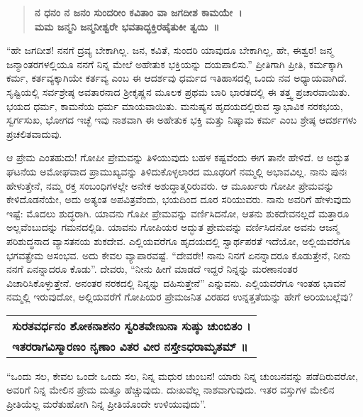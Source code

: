 \begin{verse}
\textbf{ನ ಧನಂ ನ ಜನಂ ಸುಂದರೀಂ ಕವಿತಾಂ ವಾ ಜಗದೀಶ ಕಾಮಯೇ~।}\\\textbf{ಮಮ ಜನ್ಮನಿ ಜನ್ಮನೀಶ್ವರೇ ಭವತಾದ್ಭಕ್ತಿರಹೈತುಕೀ ತ್ವಯಿ~॥}
\end{verse}

“ಹೇ ಜಗದೀಶ! ನನಗೆ ದ್ರವ್ಯ ಬೇಕಾಗಿಲ್ಲ. ಜನ, ಕವಿತೆ, ಸುಂದರಿ ಯಾವುದೂ ಬೇಕಾಗಿಲ್ಲ, ಹೇ, ಈಶ್ವರ! ಜನ್ಮ ಜನ್ಮಾಂತರಗಳಲ್ಲಿಯೂ ನನಗೆ ನಿನ್ನ ಮೇಲೆ ಅಹೇತುಕ ಭಕ್ತಿಯನ್ನು ದಯಪಾಲಿಸು.” ಪ್ರೀತಿಗಾಗಿ ಪ್ರೀತಿ, ಕರ್ಮಕ್ಕಾಗಿ ಕರ್ಮ, ಕರ್ತವ್ಯಕ್ಕಾಗಿಯೇ ಕರ್ತವ್ಯ ಎಂಬ ಈ ಆದರ್ಶವು ಧರ್ಮದ ಇತಿಹಾಸದಲ್ಲಿ ಒಂದು ನವ ಅಧ್ಯಾಯವಾಗಿದೆ. ಸೃಷ್ಟಿಯಲ್ಲಿ ಸರ್ವಶ್ರೇಷ್ಠ ಅವತಾರನಾದ ಶ‍್ರೀಕೃಷ್ಣನ ಮೂಲಕ ಪ್ರಥಮ ಬಾರಿ ಭಾರತದಲ್ಲಿ ಈ ತತ್ತ್ವ ಪ್ರಚಾರವಾಯಿತು. ಭಯದ ಧರ್ಮ, ಕಾಮನೆಯ ಧರ್ಮ ಮಾಯವಾಯಿತು. ಮನುಷ್ಯನ ಹೃದಯದಲ್ಲಿರುವ ಸ್ವಾಭಾವಿಕ ನರಕಭಯ, ಸ್ವರ್ಗಸುಖ, ಭೋಗದ ಇಚ್ಛೆ ಇವು ನಾಶವಾಗಿ ಈ ಅಹೇತುಕ ಭಕ್ತಿ ಮತ್ತು ನಿಷ್ಕಾಮ ಕರ್ಮ ಎಂಬ ಶ್ರೇಷ್ಠ ಆದರ್ಶಗಳು ಪ್ರಚಲಿತವಾದುವು.

ಆ ಪ್ರೇಮ ಎಂತಹುದು! ಗೋಪೀ ಪ್ರೇಮವನ್ನು ತಿಳಿಯುವುದು ಬಹಳ ಕಷ್ಟವೆಂದು ಈಗ ತಾನೇ ಹೇಳಿದೆ. ಆ ಅದ್ಭುತ ಘಟನೆಯ ಅಮೋಘವಾದ ಪ್ರಾಮುಖ್ಯವನ್ನು ತಿಳಿದುಕೊಳ್ಳಲಾರದ ಮೂಢರಿಗೆ ನಮ್ಮಲ್ಲಿ ಅಭಾವವಿಲ್ಲ. ನಾನು ಪುನಃ ಹೇಳುತ್ತೇನೆ, ನಮ್ಮ ರಕ್ತ ಸಂಬಂಧಿಗಳಲ್ಲೇ ಅನೇಕ ಅಶುದ್ಧಾತ್ಮರಿರುವರು. ಆ ಮೂರ್ಖರು ಗೋಪೀ ಪ್ರೇಮವನ್ನು ಕೇಳಿದೊಡನೆಯೇ, ಅದು ಅತ್ಯಂತ ಅಪವಿತ್ರವೆಂದು, ಭಯದಿಂದ ದೂರ ಸರಿಯುವರು. ನಾನು ಅವರಿಗೆ ಹೇಳುವುದು ಇಷ್ಟೆ: ಮೊದಲು ಶುದ್ಧರಾಗಿ. ಯಾವನು ಗೊಪೀ ಪ್ರೇಮವನ್ನು ವರ್ಣಿಸಿದನೋ, ಆತನು ಶುಕದೇವನಲ್ಲದೆ ಮತ್ತಾರೂ ಅಲ್ಲವೆಂಬುದನ್ನು ಗಮನದಲ್ಲಿಡಿ. ಯಾವನು ಗೋಪಿಯರ ಅದ್ಭುತ ಪ್ರೇಮವನ್ನು ವರ್ಣಿಸಿದನೋ ಅವನು ಆಜನ್ಮ ಪರಿಶುದ್ಧನಾದ ವ್ಯಾಸತನಯ ಶುಕದೇವ. ಎಲ್ಲಿಯವರೆಗೂ ಹೃದಯದಲ್ಲಿ ಸ್ವಾರ್ಥಪರತೆ ಇದೆಯೋ, ಅಲ್ಲಿಯವರೆಗೂ ಭಗವತ್ಪ್ರೇಮ ಅಸಂಭವ. ಅದು ಕೇವಲ ವ್ಯಾಪಾರವಷ್ಟೆ. “ದೇವರೇ! ನಾನು ನಿನಗೆ ಏನನ್ನಾದರೂ ಕೊಡುತ್ತೇನೆ, ನೀನು ನನಗೆ ಏನನ್ನಾದರೂ ಕೊಡು”. ದೇವರು, “ನೀನು ಹೀಗೆ ಮಾಡದೆ ಇದ್ದರೆ ನಿನ್ನನ್ನು ಮರಣಾನಂತರ ವಿಚಾರಿಸಿಕೊಳ್ಳುತ್ತೇನೆ. ಅನಂತರ ನರಕದಲ್ಲಿ ನಿನ್ನನ್ನು ದಹಿಸುತ್ತೇನೆ” ಎನ್ನುವನು. ಎಲ್ಲಿಯವರೆಗೂ ಇಂತಹ ಭಾವನೆ ನಮ್ಮಲ್ಲಿ ಇರುವುದೋ, ಅಲ್ಲಿಯವರೆಗೆ ಗೋಪಿಯರ ಪ್ರೇಮಜನಿತ ವಿರಹದ ಉನ್ನತ್ತತೆಯನ್ನು ಹೇಗೆ ಅರಿಯಬಲ್ಲೆವು?

\begin{longtable}{@{}l@{}}
\textbf{ಸುರತವರ್ಧನಂ ಶೋಕನಾಶನಂ ಸ್ವರಿತವೇಣುನಾ ಸುಷ್ಠು ಚುಂಬಿತಂ ।} \\
\textbf{ಇತರರಾಗವಿಸ್ಮಾರಣಂ ನೃಣಾಂ ವಿತರ ವೀರ ನಸ್ತೇಽಧರಾಮೃತಮ್​ ॥} \\
\end{longtable}

“ಒಂದು ಸಲ, ಕೇವಲ ಒಂದೇ ಒಂದು ಸಲ, ನಿನ್ನ ಮಧುರ ಚುಂಬನ! ಯಾರು ನಿನ್ನ ಚುಂಬನವನ್ನು ಪಡೆದಿರುವರೋ, ಅವರಿಗೆ ನಿನ್ನ ಮೇಲಿನ ಪ್ರೇಮ ಮತ್ತೂ ಹೆಚ್ಚುವುದು. ದುಃಖವೆಲ್ಲ ನಾಶವಾಗುವುದು. ಇತರ ವಸ್ತುಗಳ ಮೇಲಿನ ಪ್ರೀತಿಯೆಲ್ಲ ಮರೆತುಹೋಗಿ ನಿನ್ನ ಪ್ರೀತಿಯೊಂದೇ ಉಳಿಯುವುದು”.

